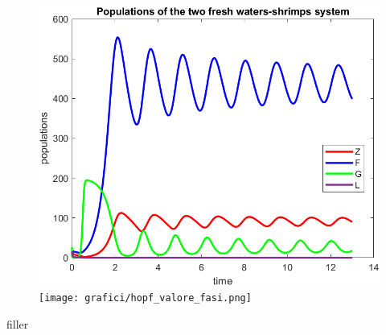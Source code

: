 \documentclass[12pt,a4paper]{article}
\numberwithin{theorem}{section}
\numberwithin{definition}{section}
\numberwithin{example}{section}
\begin{document}
\begin{figure}[h!]
    \centering
    \includegraphics[width=8 cm]{grafici/hopf_valore_popolazioni.png} 
    \texttt{[image: grafici/hopf\_valore\_fasi.png]}
    \label{hop3}
\end{figure}

\color{white} filler \color{black}

\newpage
\appendix
\end{document}
